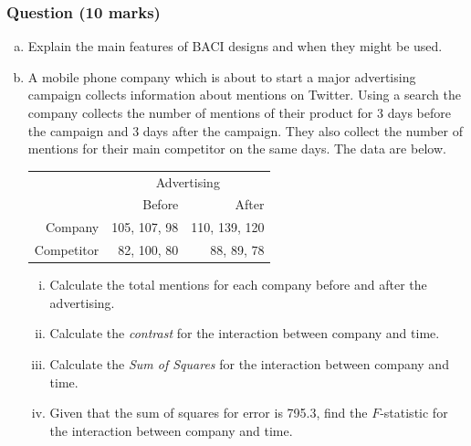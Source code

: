 \documentclass{uws_learning_guide}
\begin{document}
\subsubsection*{Question (10 marks)}

\begin{enumerate}[a)]
\item Explain the main features of BACI designs and when they might be
  used.
\item A mobile phone company which is about to start a major
  advertising campaign collects information about mentions
  on Twitter. Using a search the company collects the number of
  mentions of their product for 3 days before the campaign and 3 days
  after the campaign. They also collect the number of mentions for
  their main competitor on the same days. The data are below.

\begin{center}
\begin{tabular}{rrr}
\toprule
&\multicolumn{2}{c}{Advertising}\\
\cmidrule(r){2-3}
&Before&After\\
\midrule
Company&105, 107,  98& 110, 139, 120\\
Competitor&82, 100,  80&  88,  89,  78\\ 
\bottomrule
\end{tabular}
\end{center}

\begin{enumerate}[i)]
\item Calculate the total mentions for each company before and after
  the advertising.
\item Calculate the \emph{contrast} for the interaction between
  company and time.
\item Calculate the \emph{Sum of Squares} for the interaction between
  company and time.
\item Given that the sum of squares for error is 795.3, find the
  $F$-statistic for the interaction between
  company and time.
\end{enumerate}
\end{enumerate}
\end{document}
